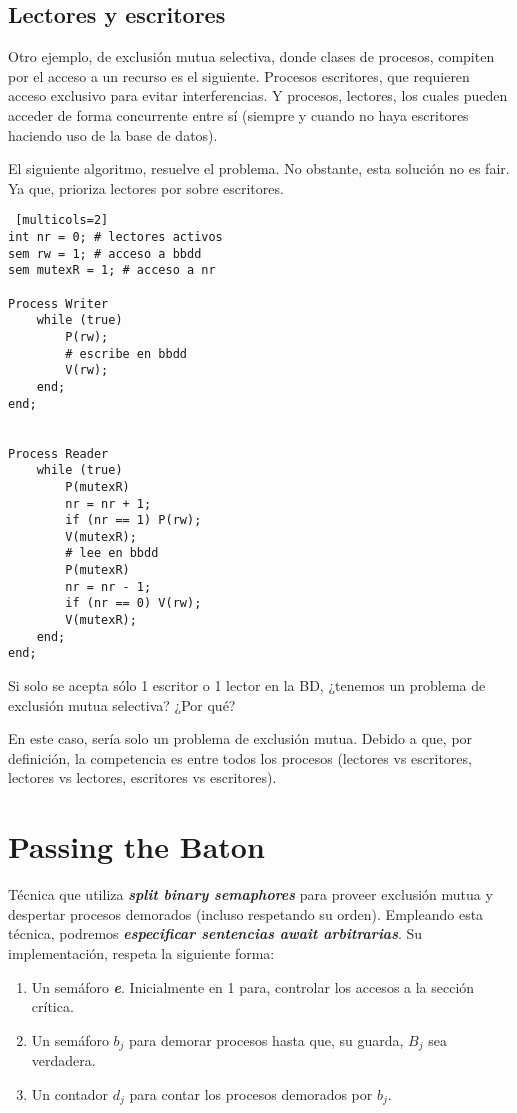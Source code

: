 \documentclass[a4paper, 10pt]{report}
\begin{document}
\subsection{Lectores y escritores}

Otro ejemplo, de exclusión mutua selectiva, donde clases de procesos, compiten por el acceso a un recurso es el siguiente. Procesos escritores, que requieren acceso exclusivo para evitar interferencias. Y procesos, lectores, los cuales pueden acceder de forma concurrente entre sí (siempre y cuando no haya escritores haciendo uso de la base de datos).

El siguiente algoritmo, resuelve el problema. No obstante, esta solución no es fair. Ya que, prioriza lectores por sobre escritores.

\begin{lstlisting} [multicols=2]
int nr = 0; # lectores activos
sem rw = 1; # acceso a bbdd
sem mutexR = 1; # acceso a nr

Process Writer
    while (true)
        P(rw);
        # escribe en bbdd
        V(rw);
    end;
end;


Process Reader
    while (true)
        P(mutexR)
        nr = nr + 1;
        if (nr == 1) P(rw);
        V(mutexR);
        # lee en bbdd
        P(mutexR)
        nr = nr - 1;
        if (nr == 0) V(rw);
        V(mutexR);
    end;
end;
\end{lstlisting}

\begin{basic_box}
     Si solo se acepta sólo 1 escritor  o 1 lector en la BD, ¿tenemos un problema de exclusión mutua selectiva? ¿Por qué?

    En este caso, sería solo un problema de exclusión mutua. Debido a que, por definición, la competencia es entre todos los procesos (lectores vs escritores, lectores vs lectores, escritores vs escritores).
\end{basic_box}

\section{Passing the Baton}

Técnica que utiliza \textbf{\emph{split binary semaphores}} para proveer exclusión mutua y despertar procesos demorados (incluso respetando su orden). Empleando esta técnica, podremos \textbf{\emph{especificar sentencias await arbitrarias}}. Su implementación, respeta la siguiente forma:

\begin{enumerate}
    \item Un semáforo \textbf{\emph{e}}. Inicialmente en 1 para, controlar los accesos a la sección crítica.
    \item Un semáforo \textbf{\emph{$b_j$}} para demorar procesos hasta que, su guarda, \textbf{\emph{$B_j$}} sea verdadera.
    \item Un contador \textbf{\emph{$d_j$}} para contar los procesos demorados por \textbf{\emph{$b_j$}}.
\end{enumerate}
\end{document}
